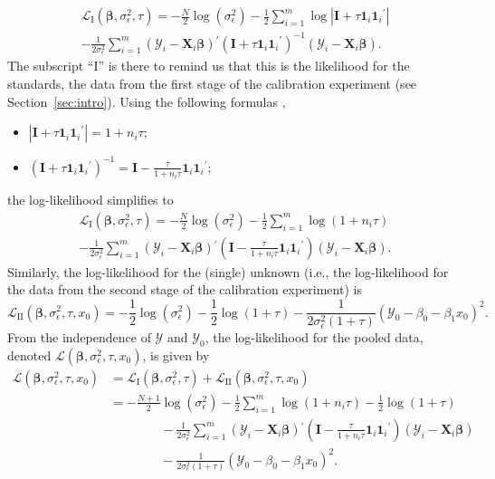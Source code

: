 \documentclass[cmfont,usenames,dvipsnames,leqno]{afit-etd}\usepackage[]{graphicx}\usepackage[]{color}
\newcommand{\newln}{\\&\quad\quad\quad\quad{}}
\newcommand{\loglik}{\mathscr{L}}
\newcommand{\trans}{\ensuremath{^\prime}}
\newcommand{\bc}[1]{\ensuremath{\bm{\mathcal{#1}}}}
\newcommand{\mc}[1]{\ensuremath{\mathcal{#1}}}
\newcommand{\X}{\ensuremath{\bm{X}}}
\begin{document}
\begin{multline*}
  \loglik_{\mathrm{I}}\left(\bm{\beta}, \sigma_\epsilon^2, \tau\right) = -\frac{N}{2}\log\left(\sigma_\epsilon^2\right) - \frac{1}{2}\sum_{i = 1}^m \log\left|\bm{I} + \tau\bm{1}_i\bm{1}_i\trans\right| \\ - \frac{1}{2\sigma_\epsilon^2}\sum_{i = 1}^m \left(\bc{Y}_i - \X_i\bm{\beta}\right)\trans\left(\bm{I} + \tau\bm{1}_i\bm{1}_i\trans\right)^{-1}\left(\bc{Y}_i - \X_i\bm{\beta}\right).
\end{multline*}
The subscript ``$\mathrm{I}$'' is there to remind us that this is the likelihood for the standards, the data from the first stage of the calibration experiment (see Section~\ref{sec:intro}). Using the following formulas \citep[pg. 49]{demidenko_mixed_2013},
\begin{itemize}
  \item $\left|\bm{I} + \tau\bm{1}_i\bm{1}_i\trans\right| = 1 + n_i\tau$;
  \item $\left(\bm{I} + \tau\bm{1}_i\bm{1}_i\trans\right)^{-1} = \bm{I} - \frac{\tau}{1 + n_i\tau}\bm{1}_i\bm{1}_i\trans$;
\end{itemize}
the log-likelihood simplifies to
\begin{multline*}
  \loglik_{\mathrm{I}}\left(\bm{\beta}, \sigma_\epsilon^2, \tau\right) = -\frac{N}{2}\log\left(\sigma_\epsilon^2\right) - \frac{1}{2}\sum_{i = 1}^m \log\left(1 + n_i\tau\right) \\ - \frac{1}{2\sigma_\epsilon^2}\sum_{i = 1}^m \left(\bc{Y}_i - \X_i\bm{\beta}\right)\trans\left(\bm{I} - \frac{\tau}{1 + n_i\tau}\bm{1}_i\bm{1}_i\trans\right)\left(\bc{Y}_i - \X_i\bm{\beta}\right).
\end{multline*}
Similarly, the log-likelihood for the (single) unknown (i.e., the log-likelihood for the data from the second stage of the calibration experiment) is 
\begin{equation*}
  \loglik_{\mathrm{II}}\left(\bm{\beta}, \sigma_\epsilon^2, \tau, x_0\right) = -\frac{1}{2}\log\left(\sigma_\epsilon^2\right) - \frac{1}{2}\log\left(1 + \tau\right) - \frac{1}{2\sigma_\epsilon^2\left(1 + \tau\right)}\left(\mc{Y}_0 - \beta_0 - \beta_1 x_0\right)^2.
\end{equation*}
From the independence of $\bc{Y}$ and $\mc{Y}_0$, the log-likelihood for the pooled data, denoted $\loglik\left(\bm{\beta}, \sigma_\epsilon^2, \tau, x_0\right)$, is given by
\begin{align*}
  \loglik\left(\bm{\beta}, \sigma_\epsilon^2, \tau, x_0\right) &= \loglik_{\mathrm{I}}\left(\bm{\beta}, \sigma_\epsilon^2, \tau\right) + \loglik_{\mathrm{II}}\left(\bm{\beta}, \sigma_\epsilon^2, \tau, x_0\right) \\
  &= -\frac{N+1}{2}\log\left(\sigma_\epsilon^2\right) - \frac{1}{2}\sum_{i = 1}^m \log\left(1 + n_i\tau\right) - \frac{1}{2}\log\left(1 + \tau\right) \newln - \frac{1}{2\sigma_\epsilon^2}\sum_{i = 1}^m \left(\bc{Y}_i - \X_i\bm{\beta}\right)\trans\left(\bm{I} - \frac{\tau}{1 + n_i\tau}\bm{1}_i\bm{1}_i\trans\right)\left(\bc{Y}_i - \X_i\bm{\beta}\right) \newln - \frac{1}{2\sigma_\epsilon^2\left(1 + \tau\right)}\left(\mc{Y}_0 - \beta_0 - \beta_1 x_0\right)^2.
\end{align*}
\end{document}
